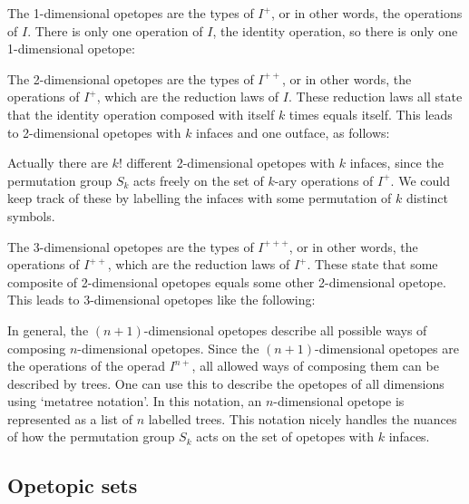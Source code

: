 \medskip
\medskip
\centerline{\epsfysize=0.2in}
\medskip

\noindent The 1-dimensional opetopes are the types of $I^+$, or in other
words, the operations of $I$.  There is only one operation of $I$, the
identity operation, so there is only one 1-dimensional opetope:

\medskip
\centerline{\epsfysize=0.3in}
\medskip

\noindent The 2-dimensional opetopes are the types of $I^{++}$, or in
other words, the operations of $I^+$, which are the reduction laws of
$I$.  These reduction laws all state that the identity operation
composed with itself $k$ times equals itself.  This leads to
2-dimensional opetopes with $k$ infaces and one outface, as follows:

\medskip
\centerline{\epsfysize=1.0in}
\medskip

\noindent Actually there are $k!$ different 2-dimensional opetopes with
$k$ infaces, since the permutation group $S_k$ acts freely on the set of
$k$-ary operations of $I^+$.  We could keep track of these by labelling
the infaces with some permutation of $k$ distinct symbols.

The 3-dimensional opetopes are the types of $I^{+++}$, or in other
words, the operations of $I^{++}$, which are the reduction laws of
$I^+$.  These state that some composite of 2-dimensional opetopes
equals some other 2-dimensional opetope.  This leads to 3-dimensional 
opetopes like the following:

\medskip
\centerline{\epsfysize=1.4in}
\medskip

In general, the $(n+1)$-dimensional opetopes describe all possible ways
of composing $n$-dimensional opetopes.  Since the $(n+1)$-dimensional
opetopes are the operations of the operad $I^{n+}$, all allowed ways of
composing them can be described by trees.  One can use this to describe
the opetopes of all dimensions using `metatree notation'.  In this
notation, an $n$-dimensional opetope is represented as a list of $n$
labelled trees.  This notation nicely handles the nuances of how the
permutation group $S_k$ acts on the set of opetopes with $k$ infaces.

\subsection{Opetopic sets}

